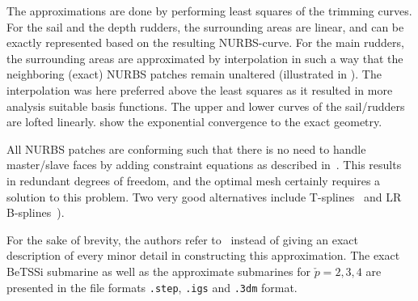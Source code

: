The approximations are done by performing least squares of the trimming curves. For the sail and the depth rudders, the surrounding areas are linear, and can be exactly represented based on the resulting NURBS-curve. For the main rudders, the surrounding areas are approximated by interpolation in such a way that the neighboring (exact) NURBS patches remain unaltered (illustrated in ). The interpolation was here preferred above the least squares as it resulted in more analysis suitable basis functions. The upper and lower curves of the sail/rudders are lofted linearly.  show the exponential convergence to the exact geometry.

All NURBS patches are conforming such that there is no need to handle master/slave faces by adding constraint equations as described in~\cite[p. 87-91]{Cottrell2006iao}. This results in redundant degrees of freedom, and the optimal mesh certainly requires a solution to this problem. Two very good alternatives include T-splines~\cite{Scott2011tsa} and LR B-splines~\cite{Johannessen2014iau}).

For the sake of brevity, the authors refer to~\cite{Venaas2019bts} instead of giving an exact description of every minor detail in constructing this approximation. The exact BeTSSi submarine as well as the approximate submarines for $\check{p}=2,3,4$ are presented in the file formats \texttt{.step}, \texttt{.igs} and \texttt{.3dm} format. 

